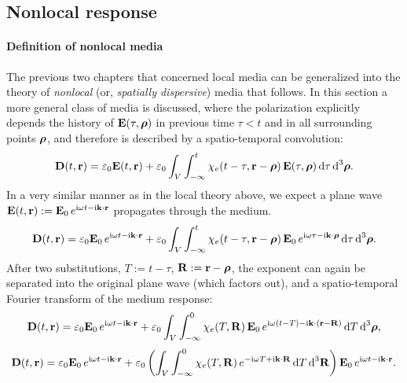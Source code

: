 
\subsection{Nonlocal response} %
\paragraph{Definition of nonlocal media}%
The previous two chapters that concerned local media can be generalized into the theory of \textit{nonlocal} (or, \textit{spatially dispersive}) media that follows.
In this section a more general class of media is discussed, where the polarization explicitly depends the history of $\mathbf{E}(\tau, \boldsymbol{\rho})$ in previous time $\tau < t$ and in all surrounding points $\boldsymbol{\rho}$, and therefore is described by a spatio-temporal convolution:
\begin{equation} \mathbf{D}(t,{\mathbf{r}}) = \varepsilon_0 \mathbf{E}(t,{\mathbf{r}}) + \varepsilon_0\int_{V} \int_{-\infty}^{t} \chi_e(t-\tau, {\mathbf{r}}-\boldsymbol{\rho}) \, \mathbf{E}(\tau,\boldsymbol{\rho}) \,\mbox{d}\tau \,\mbox{d}^3\boldsymbol{\rho}. \label{eq_chi_convol_nonloc}\end{equation}
In a very similar manner as in the local theory above, we expect a plane wave $\mathbf{E}(t, {\mathbf{r}}) := \mathbf{E}_0 \, e^{{\mathrm i}\omega t - {\mathrm i}{\mathbf{k}}\cdot{\mathbf{r}}}$ propagates through the medium. 
\begin{equation} \mathbf{D}(t,{\mathbf{r}}) = \varepsilon_0 \mathbf{E}_0 \, e^{{\mathrm i}\omega t - {\mathrm i}{\mathbf{k}}\cdot{\mathbf{r}}} + \varepsilon_0\int_{V} \int_{-\infty}^{t} \chi_e(t-\tau, {\mathbf{r}}-\boldsymbol{\rho}) \, \mathbf{E}_0 \, e^{{\mathrm i}\omega \tau - {\mathrm i}{\mathbf{k}}\cdot\boldsymbol{\rho}} \,\mbox{d}\tau \,\mbox{d}^3\boldsymbol{\rho}. \label{eq_chi_convol_harm_nonloc}\end{equation}
After two  substitutions, $T:=t-\tau$, $\mathbf{R}:={\mathbf{r}}-\boldsymbol{\rho}$, the exponent can again be separated into the original plane wave (which factors out), and a spatio-temporal Fourier transform of the medium response:
$$				 \mathbf{D}(t,{\mathbf{r}}) = \varepsilon_0 \mathbf{E}_0 \, e^{{\mathrm i}\omega t - {\mathrm i}{\mathbf{k}}\cdot{\mathbf{r}}} + \varepsilon_0\int_{V} \int_{-\infty}^{0} \chi_e(T, \mathbf{R}) \, \mathbf{E}_0 \, e^{{\mathrm i}\omega (t - T) - {\mathrm i}{\mathbf{k}}\cdot({\mathbf{r}} - \mathbf{R})} \,\mbox{d}T \,\mbox{d}^3\boldsymbol{\rho},$$
$$				 \mathbf{D}(t,{\mathbf{r}}) = \varepsilon_0 \mathbf{E}_0 \, e^{{\mathrm i}\omega t - {\mathrm i}{\mathbf{k}}\cdot{\mathbf{r}}} + \varepsilon_0\left( \int_{V} \int_{-\infty}^{0} \chi_e(T, \mathbf{R})  \, e^{-{\mathrm i}\omega T + {\mathrm i}{\mathbf{k}}\cdot \mathbf{R}}\,\mbox{d}T \,\mbox{d}^3 \mathbf{R} \right) \mathbf{E}_0 \, e^{{\mathrm i}\omega t - {\mathrm i}{\mathbf{k}}\cdot{\mathbf{r}}}.$$
